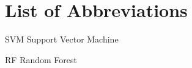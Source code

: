 \chapter*{List of Abbreviations}
\begin{abbrv}
    
    \item[SVM]			Support 
    Vector Machine
    \item[RF]			Random 
    Forest
\end{abbrv}

